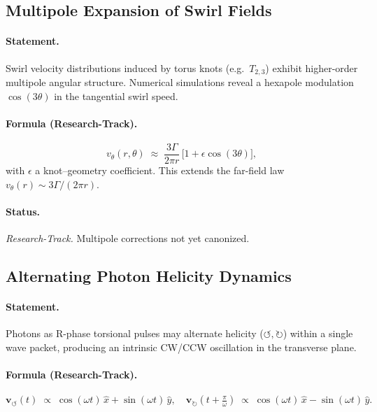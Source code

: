 \documentclass[10pt,reprint,aps,onecolumn,nofootinbib]{revtex4-2}
\begin{document}
\subsection{Multipole Expansion of Swirl Fields}
    \paragraph{Statement.}
        Swirl velocity distributions induced by torus knots (e.g.\ $T_{2,3}$) exhibit higher-order
        multipole angular structure. Numerical simulations reveal a hexapole modulation
        $\cos(3\theta)$ in the tangential swirl speed.

    \paragraph{Formula (Research-Track).}
        \[
            v_\theta(r,\theta) \;\approx\; \frac{3\Gamma}{2\pi r}\,\Big[1 + \epsilon \cos(3\theta)\Big],
        \]
        with $\epsilon$ a knot–geometry coefficient. This extends the far-field law
        $v_\theta(r)\sim 3\Gamma/(2\pi r)$.

    \paragraph{Status.} \emph{Research-Track.} Multipole corrections not yet canonized.

\subsection{Alternating Photon Helicity Dynamics}
\paragraph{Statement.}
    Photons as R-phase torsional pulses may alternate helicity ($\circlearrowleft,\circlearrowright$) within
    a single wave packet, producing an intrinsic CW/CCW oscillation in the transverse plane.

\paragraph{Formula (Research-Track).}
    \[
        \mathbf{v}_{\!\boldsymbol{\circlearrowleft}}(t) \;\propto\;
        \cos(\omega t)\,\hat{x} + \sin(\omega t)\,\hat{y},
        \quad
        \mathbf{v}_{\!\boldsymbol{\circlearrowright}}(t+\tfrac{\pi}{\omega})\;\propto\;
        \cos(\omega t)\,\hat{x} - \sin(\omega t)\,\hat{y}.
    \]
\end{document}
